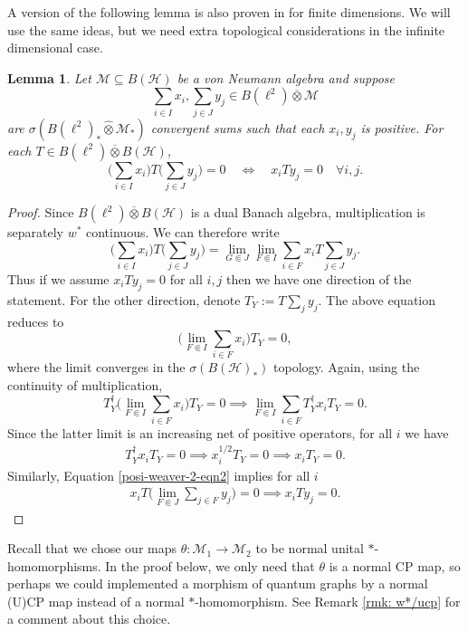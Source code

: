 \documentclass[12pt]{article}
\newtheorem{lemma}[theorem]{Lemma}
\theoremstyle{definition}
\newenvironment{remark}
  {\pushQED{\qed}\renewcommand{\qedsymbol}{\textcircled{\tiny R}}\remarkx}
  {\popQED\endremarkx}
\newcommand{\mc}[1]{\mathcal{#1}}
\newcommand{\<}{\langle}
\renewcommand{\>}{\rangle}
\renewcommand{\hat}[1]{\widehat{#1}}
\renewcommand{\subset}{\subseteq}
\renewcommand{\bar}[1]{\overline{#1}}
\begin{document}
A version of the following lemma is also proven in \cite[Lemma 8.3]{weavergraphsrelations} for finite dimensions. We will use the same ideas, but we need extra topological considerations in the infinite dimensional case.

\begin{lemma} \label{lem: positivity-weaver-2}
    Let $\mc M \subset B(\mc H)$ be a von Neumann algebra and suppose
        \[
        \sum_{i\in I} x_i, \sum_{j \in J} y_j \in B(\ell^2) \bar{\otimes} \mc M
        \]
        are $\sigma(B(\ell^2)_* \hat \otimes \mc M_*)$ convergent sums such that each $x_i, y_j$ is positive. For each $T \in B(\ell^2) \overline{\otimes} B(\mc H)$,
        \[
        \bigg(\sum_{i\in I} x_i\bigg) T \bigg(\sum_{j \in J} y_j\bigg) = 0 \quad \iff \quad x_i T y_j = 0 \quad  \forall i,j.
        \]
\end{lemma}
\begin{proof}
    Since $B(\ell^2) \overline{\otimes} B(\mc H)$ is a dual Banach algebra, multiplication is separately $w^*$ continuous. We can therefore write
    \[
    \bigg(\sum_{i \in I} x_i\bigg) T \bigg(\sum_{j \in J} y_j\bigg) = \lim_{G \Subset J}\lim_{F \Subset I} \sum_{i \in F} x_i T \sum_{j \in J}y_j.
    \]
    Thus if we assume $x_i T y_j = 0$ for all $i,j$ then we have one direction of the statement. For the other direction, denote $T_Y := T\sum_j y_j$. The above equation reduces to
    \[
    \bigg(\lim_{F \Subset I} \sum_{i \in F} x_i\bigg) T_Y= 0,
    \]
    where the limit converges in the $\sigma(B(\mc H)_*)$ topology. Again, using the continuity of multiplication,
    \[
     T_Y^\dagger\bigg( \lim_{F \Subset I} \sum_{i \in F} x_i \bigg)T_Y = 0 \implies  \lim_{F \Subset I} \sum_{i \in F} T_Y^\dagger x_iT_Y = 0.
    \]
    Since the latter limit is an increasing net of positive operators, for all $i$ we have
    \begin{align} \label{posi-weaver-2-eqn2}
    T_Y^\dagger x_iT_Y = 0 \implies x_i^{1/2}T_Y = 0 \implies x_i T_Y = 0.
    \end{align}
    Similarly, Equation \ref{posi-weaver-2-eqn2} implies for all $i$
    \begin{align} \label{posi-weaver-2-eqn3}
    x_iT\bigg( \lim_{F \Subset J} \sum_{j \in F} y_j \bigg) = 0 \implies x_iTy_j = 0.
    \end{align}
\end{proof}

\begin{remark}
Recall that we chose our maps $\theta: \mc M_1 \to \mc M_2$ to be normal unital $*$-homomorphisms. In the proof below, we only need that $\theta$ is a normal CP map, so perhaps we could implemented a morphism of quantum graphs by a normal (U)CP map instead of a normal $*$-homomorphism. See Remark \ref{rmk: w*/ucp} for a comment about this choice.
\end{remark}
\end{document}
